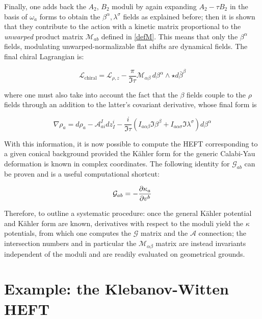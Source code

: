 Finally, one adds back the $A_2$, $B_2$ moduli by again expanding $A_2 - \tau B_2$ in the basis of $\omega_a$ forms to obtain the $\beta^\alpha, \lambda^\sigma$ fields as explained before; then it is shown that they contribute to the action with a kinetic matrix proportional to the \emph{unwarped} product matrix $\mathcal{M}_{ab}$ defined in \ref{defM}. This means that only the $\beta^\alpha$ fields, modulating unwarped-normalizable flat shifts are dynamical fields. The final chiral Lagrangian is:

\begin{equation}
	\mathcal{L}_\text{chiral} = \mathcal{L}_{\rho,z} - \frac{\pi}{\Im\tau} \mathcal{M}_{\alpha\beta} \,d\beta^\alpha \wedge \star d\bar \beta^\beta
	\label{}
\end{equation}

where one must also take into account the fact that the $\beta$ fields couple to the $\rho$ fields through an addition to the latter's covariant derivative, whose final form is

\begin{equation}
	\nabla \rho_a = d\rho_a - \mathcal{A}_{ai}^I dz^i_I - \frac{i}{\Im \tau}\left( I_{a\alpha\beta} \Im \beta^\beta + I_{a\alpha\sigma} \Im \lambda^\sigma \right) d\beta^\alpha
	\label{}
\end{equation}

With this information, it is now possible to compute the HEFT corresponding to a given conical background provided the K\"ahler form for the generic Calabi-Yau deformation is known in complex coordinates. The following identity for $\mathcal{G}_{ab}$ can be proven\cite{MZ} and is a useful computational shortcut:

\begin{equation}
	\mathcal{G}_{ab} = - \frac{\partial\kappa_a}{\partial v^b}
	\label{Gshortcut}
\end{equation}

Therefore, to outline a systematic procedure: once the general K\"ahler potential and K\"ahler form are known, derivatives with respect to the moduli yield the $\kappa$ potentials, from which one computes the $\mathcal{G}$ matrix and the $\mathcal{A}$ connection; the intersection numbers and in particular the $\mathcal{M}_{\alpha\beta}$ matrix are instead invariants independent of the moduli and are readily evaluated on geometrical grounds.

\section{Example: the Klebanov-Witten HEFT}

